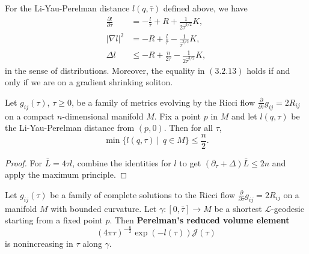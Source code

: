 \begin{lemma}
  \label{lem:cz-identities-for-liyauperelman-distance}
For the Li-Yau-Perelman distance $l(q,\bar{\tau})$ defined above,
we have
\begin{align}
\frac{\partial l}{\partial  \bar{\tau}}
&=-\frac{l}{\bar{\tau}}+R+\frac{1}{2\bar{\tau}^{3/2}}K,\\
|\nabla l|^2&=-R+\frac{l}{\bar{\tau}}-\frac{1}{\bar{\tau}^{3/2}}K,\\
\Delta l
&\leq-R+\frac{n}{2\bar{\tau}}-\frac{1}{2\bar{\tau}^{3/2}}K,
\end{align}
in the sense of distributions. Moreover, the equality in
$(3.2.13)$ holds if and only if we are on a gradient shrinking
soliton.
\end{lemma}

\begin{corollary}
  \label{cor:cz-conjugate-heat-inequality-for-reduced-density}
Let $g_{ij}(\tau)$, $\tau\geq 0$, be a family of metrics evolving
by the Ricci flow $\frac{\partial}{\partial \tau}g_{ij}=2R_{ij}$
on a compact $n$-dimensional manifold $M$. Fix a point $p$ in $M$
and let $l(q,\tau)$ be the Li-Yau-Perelman distance from $(p,0)$.
Then for all $\tau$,
$$
\min\{l(q,\tau)\ |\ \ q\in M\}\leq\frac{n}{2}.
$$
\end{corollary}

\begin{proof}
  \sketch For $\bar L=4\tau l$, combine the identities for $l$ to get $(\partial_\tau+\Delta)\bar L\le2n$ and apply the maximum principle.
\end{proof}

\begin{theorem}
  \label{thm:cz-perelmans-reduced-jacobian-comparison}
Let $g_{ij}(\tau)$ be a family of complete solutions to the Ricci
flow $\frac{\partial}{\partial \tau}g_{ij}=2R_{ij}$ on a manifold
$M$ with bounded curvature. Let $\gamma:[0,\bar\tau]\rightarrow M$
be a shortest $\mathcal{L}$-geodesic starting from a fixed point
$p$. Then {\bf Perelman's reduced volume element}
$$
(4\pi\tau)^{-\frac{n}{2}}\exp(-l(\tau)){\mathcal{J}(\tau)}
$$
is nonincreasing in $\tau$ along $\gamma$.
\end{theorem}


